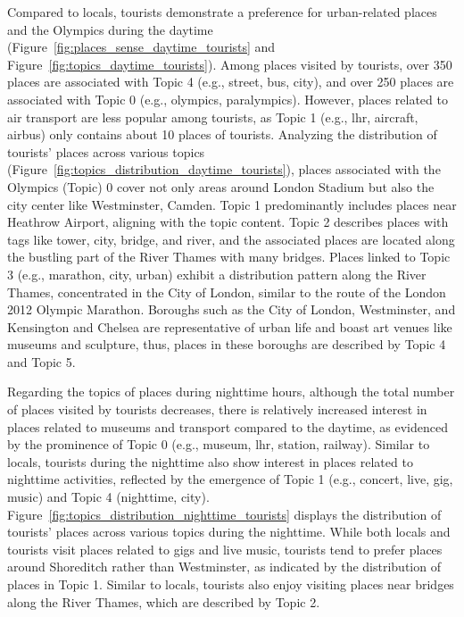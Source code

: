 \documentclass{article}
\theoremstyle{definition}
\theoremstyle{remark}
\begin{document}
Compared to locals, tourists demonstrate a preference for urban-related places and the Olympics during the daytime (Figure~\ref{fig:places_sense_daytime_tourists} and Figure~\ref{fig:topics_daytime_tourists}). Among places visited by tourists, over 350 places are associated with Topic 4 (e.g., street, bus, city), and over 250 places are associated with Topic 0 (e.g., olympics, paralympics). However, places related to air transport are less popular among tourists, as Topic 1 (e.g., lhr, aircraft, airbus) only contains about 10 places of tourists. Analyzing the distribution of tourists' places across various topics (Figure~\ref{fig:topics_distribution_daytime_tourists}), places associated with the Olympics (Topic) 0 cover not only areas around London Stadium but also the city center like Westminster, Camden. Topic 1 predominantly includes places near Heathrow Airport, aligning with the topic content. Topic 2 describes places with tags like tower, city, bridge, and river, and the associated places are located along the bustling part of the River Thames with many bridges. Places linked to Topic 3 (e.g., marathon, city, urban) exhibit a distribution pattern along the River Thames, concentrated in the City of London, similar to the route of the London 2012 Olympic Marathon. Boroughs such as the City of London, Westminster, and Kensington and Chelsea are representative of urban life and boast art venues like museums and sculpture, thus, places in these boroughs are described by Topic 4 and Topic 5.

Regarding the topics of places during nighttime hours, although the total number of places visited by tourists decreases, there is relatively increased interest in places related to museums and transport compared to the daytime, as evidenced by the prominence of Topic 0 (e.g., museum, lhr, station, railway). Similar to locals, tourists during the nighttime also show interest in places related to nighttime activities, reflected by the emergence of Topic 1 (e.g., concert, live, gig, music) and Topic 4 (nighttime, city). Figure~\ref{fig:topics_distribution_nighttime_tourists} displays the distribution of tourists' places across various topics during the nighttime. While both locals and tourists visit places related to gigs and live music, tourists tend to prefer places around Shoreditch rather than Westminster, as indicated by the distribution of places in Topic 1. Similar to locals, tourists also enjoy visiting places near bridges along the River Thames, which are described by Topic 2.
\end{document}
